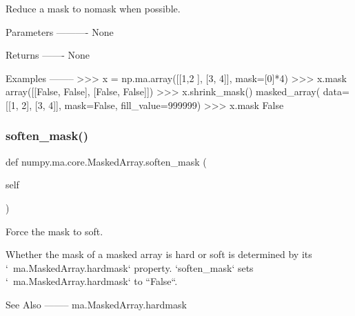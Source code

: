 \begin{DoxyVerb}Reduce a mask to nomask when possible.

Parameters
----------
None

Returns
-------
None

Examples
--------
>>> x = np.ma.array([[1,2 ], [3, 4]], mask=[0]*4)
>>> x.mask
array([[False, False],
       [False, False]])
>>> x.shrink_mask()
masked_array(
  data=[[1, 2],
[3, 4]],
  mask=False,
  fill_value=999999)
>>> x.mask
False\end{DoxyVerb}
 \mbox{\label{classnumpy_1_1ma_1_1core_1_1MaskedArray_ac047bfe654e0211a85f30f4072b819fa}} 
\subsubsection{\texorpdfstring{soften\+\_\+mask()}{soften\_mask()}}
{\footnotesize\ttfamily def numpy.\+ma.\+core.\+Masked\+Array.\+soften\+\_\+mask (\begin{DoxyParamCaption}\item[{}]{self }\end{DoxyParamCaption})}

\begin{DoxyVerb}Force the mask to soft.

Whether the mask of a masked array is hard or soft is determined by
its `~ma.MaskedArray.hardmask` property. `soften_mask` sets
`~ma.MaskedArray.hardmask` to ``False``.

See Also
--------
ma.MaskedArray.hardmask\end{DoxyVerb}
 \mbox{\label{classnumpy_1_1ma_1_1core_1_1MaskedArray_a511cd724a830d29415fab5935ffd8808}} 
